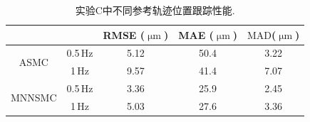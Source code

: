 \begin{table}[H]
	\caption{实验C中不同参考轨迹位置跟踪性能.}
	\label{实验C}
	\centering
	\setlength{\tabcolsep}{3mm} 
	\begin{tabular}{ccccc}
		\toprule[1.5pt]
		& \text{参考轨迹} & RMSE ($\text{$\upmu$m}$) & MAE ($\text{$\upmu$m}$) & $\text{MAD}$($\text{$\upmu$m}$)   \\ 
		\midrule
		\multirow{2}{*}{ASMC}     
		& 0.5\,Hz           & 5.12      & 50.4 &3.22  \\ 
		& 1\,Hz             & 9.57      & 41.4 &7.07  \\ 
		\midrule
		\multirow{2}{*}{MNNSMC} 
		& 0.5\,Hz           & 3.36      & 25.9 &2.45  \\ 
		& 1\,Hz             & 5.03      & 27.6 &3.36  \\ 
		\bottomrule[1.5pt]
	\end{tabular}
\end{table}

